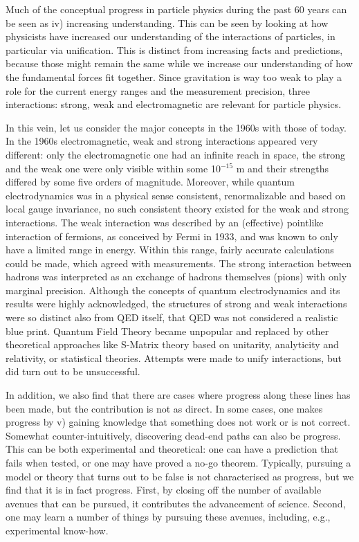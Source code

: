 Much of the conceptual progress in particle physics during the past 60 years can be seen as iv) increasing understanding.
This can be seen by looking at how physicists have increased our understanding of the interactions of particles, in particular via unification. 
This is distinct from increasing facts and predictions, because those might remain the same while we increase our understanding of how the fundamental forces fit together. 
Since gravitation is way too weak to play a role for the current energy ranges and the measurement precision, three interactions: strong, weak and electromagnetic are relevant for particle physics.

In this vein, let us consider the major concepts in the 1960s with those of today.
In the 1960s electromagnetic, weak and strong interactions appeared very different: only the electromagnetic one had an infinite reach in space, 
the strong and the weak one were only visible within some 10$^{-15}$ m and
their strengths differed by some five orders of magnitude. 
Moreover, while quantum electrodynamics was in a physical sense consistent, renormalizable and based on local gauge invariance, no such consistent theory existed for the weak and strong interactions.
The weak interaction was described by an (effective) pointlike interaction of fermions, as conceived by Fermi in 1933, and was known to only have a limited range in energy.
Within this range, fairly accurate calculations could be made, which agreed with measurements.
The strong interaction between hadrons was interpreted as an exchange of hadrons themselves (pions) with only marginal precision.
Although the concepts of quantum electrodynamics and its results were highly acknowledged, the structures of strong and weak interactions were so distinct also from QED itself, that QED was not considered a realistic blue print.
Quantum Field Theory became unpopular and replaced by other theoretical approaches like S-Matrix theory based on unitarity, analyticity and relativity, or statistical theories.
Attempts were made to unify interactions, but did turn out to be unsuccessful.

In addition, we also find that there are cases where progress along these lines has been made, but the contribution is not as direct. 
In some cases, one makes progress by v) gaining knowledge that something does not work or is not correct.
Somewhat counter-intuitively, discovering dead-end paths can also be progress. 
This can be both experimental and theoretical: one can have a prediction that fails when tested, or one may have proved a no-go theorem. 
Typically, pursuing a model or theory that turns out to be false is not characterised as progress, but we find that it is in fact progress. 
First, by closing off the number of available avenues that can be pursued, it contributes the advancement of science. 
Second, one may learn a number of things by pursuing these avenues, including, e.g., experimental know-how. 

